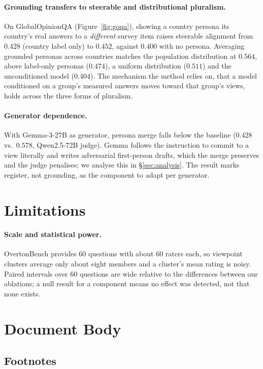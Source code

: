 \documentclass[11pt]{article}
\begin{document}
\paragraph{Grounding transfers to steerable and distributional pluralism.}
On GlobalOpinionQA (Figure~\ref{fig:goqa}), showing a country persona its
country's real answers to a \emph{different} survey item raises steerable
alignment from $0.428$ (country label only) to $0.452$, against $0.400$ with
no persona. Averaging grounded personas across countries matches the
population distribution at $0.564$, above label-only personas ($0.474$), a
uniform distribution ($0.511$) and the unconditioned model ($0.404$). The
mechanism the method relies on, that a model conditioned on a group's measured
answers moves toward that group's views, holds across the three forms of
pluralism.

\paragraph{Generator dependence.}
With Gemma-3-27B as generator, persona merge falls below the baseline
($0.428$ vs.\ $0.578$, Qwen2.5-72B judge). Gemma follows the instruction to
commit to a view literally and writes adversarial first-person drafts, which
the merge preserves and the judge penalises; we analyse this in
\S\ref{sec:analysis}. The result marks register, not grounding, as the
component to adapt per generator.

\section{Limitations}
\paragraph{Scale and statistical power.}
OvertonBench provides 60 questions with about 60 raters each, so viewpoint
clusters average only about eight members and a cluster's mean rating is noisy.
Paired intervals over 60 questions are wide relative to the differences between
our ablations; a null result for a component means no effect was detected, not
that none exists.


\section{Document Body}

\subsection{Footnotes}
\end{document}
